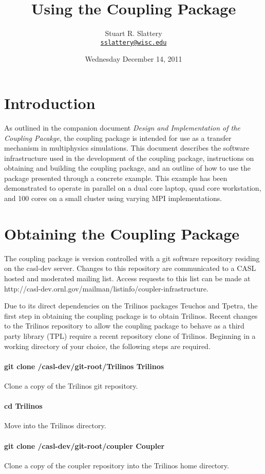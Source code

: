 \documentclass[letterpaper]{article}
\author{Stuart R. Slattery
\\ \href{mailto:sslattery@wisc.edu}{\texttt{sslattery@wisc.edu}}
}
\date{Wednesday December 14, 2011}
\title{Using the Coupling Package}
\begin{document}
\maketitle

\section{Introduction}
As outlined in the companion document {\sl Design and Implementation of
the Coupling Pacakge}, the coupling package is intended for use as a
transfer mechanism in multiphysics simulations. This document
describes the software infrastructure used in the development of the
coupling package, instructions on obtaining and building the coupling
package, and an outline of how to use the package presented through a
concrete example. This example has been demonstrated to operate in
parallel on a dual core laptop, quad core workstation, and 100 cores
on a small cluster using varying MPI implementations.

\section{Obtaining the Coupling Package}
The coupling package is version controlled with a git software
repository residing on the casl-dev server. Changes to this repository
are communicated to a CASL hosted and moderated mailing list. Access
requests to this list can be made at
http://casl-dev.ornl.gov/mailman/listinfo/coupler-infrastructure.

Due to its direct dependencies on the Trilinos packages Teuchos and
Tpetra, the first step in obtaining the coupling package is to obtain
Trilinos. Recent changes to the Trilinos repository to allow the
coupling package to behave as a third party library (TPL) require a
recent repository clone of Trilinos. Beginning in a working directory
of your choice, the following steps are required.

\paragraph{git clone /casl-dev/git-root/Trilinos Trilinos}
Clone a copy of the Trilinos git repository.

\paragraph{cd Trilinos}
Move into the Trilinos directory.

\paragraph{git clone /casl-dev/git-root/coupler Coupler} 
Clone a copy of the coupler repository into the Trilinos home
directory.
\end{document}

